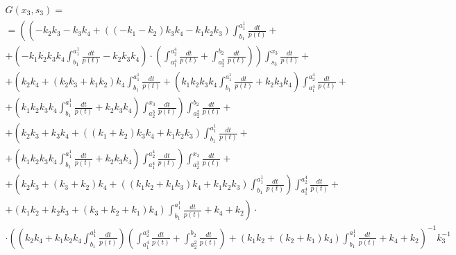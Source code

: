 \documentclass[a4paper,12pt]{article} %
\begin{document}
\begin{multline}
	G(x_3,s_3)=\\=
	\left(
		\left(
			-k_2 k_3-k_3 k_4+\left( \left( -k_1-k_2\right)  k_3 k_4-k_1 k_2 k_3\right)  \int_{b_1}^{a_1^1}\frac{dt}{p(t)}
			\right. \right. + \\ + \left. \left.
			\left( -k_1 k_2 k_3 k_4 \int_{b_1}^{a_1^1}\frac{dt}{p(t)}-k_2 k_3 k_4\right)\cdot
			\left(
				\int_{a_1^4}^{a_2^4}\frac{dt}{p(t)} + \int_{a_2^2}^{b_2}\frac{dt}{p(t)}
			\right)
		\right)
		\int_{s_3}^{x_3}\frac{dt}{p(t)}
		\right. + \\ + \left.
		\left(
			k_2 k_4+\left( k_2 k_3+k_1 k_2\right)  k_4 \int_{b_1}^{a_1^1}\frac{dt}{p(t)}+
			\left( k_1 k_2 k_3 k_4 \int_{b_1}^{a_1^1}\frac{dt}{p(t)}+k_2 k_3 k_4\right)  \int_{a_1^4}^{a_2^4}\frac{dt}{p(t)}
			\right. \right. + \\ + \left. \left.
			\left( k_1 k_2 k_3 k_4 \int_{b_1}^{a_1^1}\frac{dt}{p(t)}+k_2 k_3 k_4\right)  \int_{a_2^3}^{x_3}\frac{dt}{p(t)}
		\right)
		\int_{a_2^2}^{b_2}\frac{dt}{p(t)}
		\right. + \\ + \left.
		\left( k_2 k_3+k_3 k_4+\left( \left( k_1+k_2\right)  k_3 k_4+k_1 k_2 k_3\right)  \int_{b_1}^{a_1^1}\frac{dt}{p(t)}
		\right. \right. + \\ + \left. \left.
		\left( k_1 k_2 k_3 k_4 \int_{b_1}^{a_1^1}\frac{dt}{p(t)}+k_2 k_3 k_4\right)  \int_{a_1^4}^{a_2^4}\frac{dt}{p(t)}\right)  \int_{a_2^3}^{x_3}\frac{dt}{p(t)}
		\right. + \\ + \left.
		\left( k_2 k_3+\left( k_3+k_2\right)  k_4+\left( \left( k_1 k_2+k_1 k_3\right)  k_4+k_1 k_2 k_3\right)  \int_{b_1}^{a_1^1}\frac{dt}{p(t)}\right)  \int_{a_1^4}^{a_2^4}\frac{dt}{p(t)}
		\right. + \\ + \left.
		\left( k_1 k_2+k_2 k_3+\left( k_3+k_2+k_1\right)  k_4\right)  \int_{b_1}^{a_1^1}\frac{dt}{p(t)}+k_4+k_2
	\right) \cdot \\ \cdot \left(
		\left( k_2 k_4+k_1 k_2 k_4 \int_{b_1}^{a_1^1}\frac{dt}{p(t)}\right)
		\left( \int_{a_1^4}^{a_2^4}\frac{dt}{p(t)}+ \int_{a_2^2}^{b_2}\frac{dt}{p(t)} \right)+
		\left( k_1 k_2+\left( k_2+k_1\right)  k_4\right)  \int_{b_1}^{a_1^1}\frac{dt}{p(t)}+k_4+k_2
	\right)^{-1}  k_3^{-1}
\end{multline}
\end{document}
